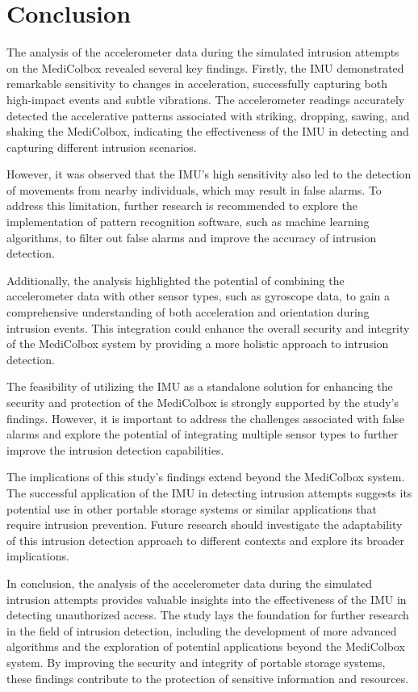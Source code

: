 \documentclass[../main.tex]{subfiles}
\begin{document}
\clearpage
\section{Conclusion}
The analysis of the accelerometer data during the simulated intrusion attempts on the MediColbox revealed several key findings. Firstly, the IMU demonstrated remarkable sensitivity to changes in acceleration, successfully capturing both high-impact events and subtle vibrations. The accelerometer readings accurately detected the accelerative patterns associated with striking, dropping, sawing, and shaking the MediColbox, indicating the effectiveness of the IMU in detecting and capturing different intrusion scenarios.

However, it was observed that the IMU's high sensitivity also led to the detection of movements from nearby individuals, which may result in false alarms. To address this limitation, further research is recommended to explore the implementation of pattern recognition software, such as machine learning algorithms, to filter out false alarms and improve the accuracy of intrusion detection.

Additionally, the analysis highlighted the potential of combining the accelerometer data with other sensor types, such as gyroscope data, to gain a comprehensive understanding of both acceleration and orientation during intrusion events. This integration could enhance the overall security and integrity of the MediColbox system by providing a more holistic approach to intrusion detection.

The feasibility of utilizing the IMU as a standalone solution for enhancing the security and protection of the MediColbox is strongly supported by the study's findings. However, it is important to address the challenges associated with false alarms and explore the potential of integrating multiple sensor types to further improve the intrusion detection capabilities.

The implications of this study's findings extend beyond the MediColbox system. The successful application of the IMU in detecting intrusion attempts suggests its potential use in other portable storage systems or similar applications that require intrusion prevention. Future research should investigate the adaptability of this intrusion detection approach to different contexts and explore its broader implications.

In conclusion, the analysis of the accelerometer data during the simulated intrusion attempts provides valuable insights into the effectiveness of the IMU in detecting unauthorized access. The study lays the foundation for further research in the field of intrusion detection, including the development of more advanced algorithms and the exploration of potential applications beyond the MediColbox system. By improving the security and integrity of portable storage systems, these findings contribute to the protection of sensitive information and resources.
\end{document}
